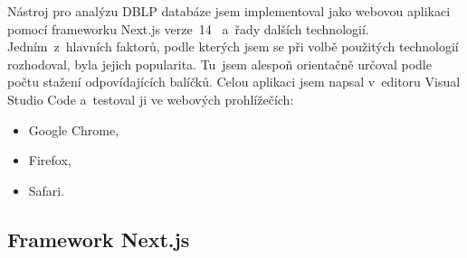 \documentclass[
  biblatex,
  sourcecodes,
  glossaries,
  index
]{kidiplom}
\begin{document}
Nástroj pro analýzu DBLP databáze jsem implementoval jako webovou aplikaci pomocí frameworku Next.js verze~14~\cite{t13} a~řady dalších technologií. Jedním~z~hlavních faktorů, podle kterých jsem se při volbě použitých technologií rozhodoval, byla jejich popularita. Tu~jsem alespoň orientačně určoval podle počtu stažení odpovídajících balíčků. Celou aplikaci jsem napsal v~editoru Visual Studio Code a~testoval ji ve webových prohlížečích:
\begin{itemize}
\item Google Chrome,
\item Firefox,
\item Safari.
\end{itemize}

\subsection{Framework Next.js}
\end{document}

